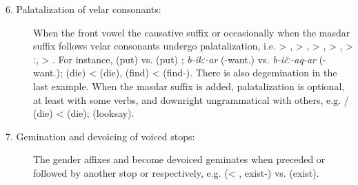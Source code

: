 \begin{description}
\item[6. Palatalization of velar consonants:] When the front vowel  the causative suffix  or occasionally when the masdar suffix  follows velar consonants undergo palatalization, i.e.  > , > ,  > ,  > ,  > ː,  > . For instance,  (put)  vs.  (put) ; \textit{b-ikː-ar} (-want.) vs. \textit{b-ičː-aq-ar} (-want.);  (die) <  (die),  (find) <  (find-). There is also degemination in the last example. When the masdar suffix is added, palatalization is optional, at least with some verbs, and downright ungrammatical with others, e.g. \slash{} (die) <  (die);  (looksay).
\item[7. Gemination and devoicing of voiced stops:] The gender affixes  and  become devoiced geminates when preceded or followed by another stop  or  respectively, e.g.  (< , exist-) vs.  (exist).

\end{description}
